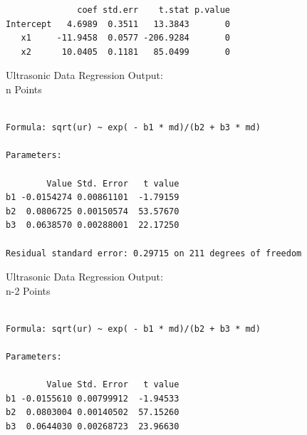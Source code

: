 {{{\begin{verbatim}
              coef std.err    t.stat p.value 
Intercept   4.6989  0.3511   13.3843       0
   x1     -11.9458  0.0577 -206.9284       0
   x2      10.0405  0.1181   85.0499       0
\end{verbatim}
}
\clearpage
\begin{figure}
\end{figure}
\begin{figure}
\end{figure}
\begin{figure}
\end{figure}
\begin{figure}
\end{figure}
\clearpage
\newpage
\begin{center}
Ultrasonic Data Regression Output: \\ n Points
\end{center}
{\large
\begin{verbatim}

Formula: sqrt(ur) ~ exp( - b1 * md)/(b2 + b3 * md)

Parameters:

        Value Std. Error   t value 
b1 -0.0154274 0.00861101  -1.79159
b2  0.0806725 0.00150574  53.57670
b3  0.0638570 0.00288001  22.17250

Residual standard error: 0.29715 on 211 degrees of freedom
\end{verbatim}
}
\vspace{0.5in}
\begin{center}
Ultrasonic Data Regression Output: \\ n-2 Points
\end{center}
{\large
\begin{verbatim}

Formula: sqrt(ur) ~ exp( - b1 * md)/(b2 + b3 * md)

Parameters:

        Value Std. Error   t value 
b1 -0.0155610 0.00799912  -1.94533
b2  0.0803004 0.00140502  57.15260
b3  0.0644030 0.00268723  23.96630


\end{verbatim}}}}
